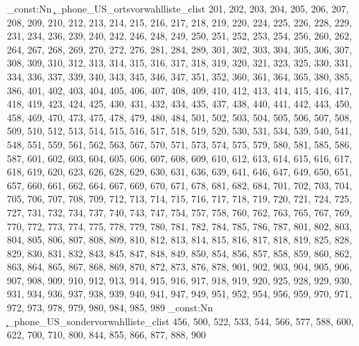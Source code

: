\clist_const:Nn \c_phone_US_ortsvorwahlliste_clist {201,
202,
203,
204,
205,
206,
207,
208,
209,
210,
212,
213,
214,
215,
216,
217,
218,
219,
220,
224,
225,
226,
228,
229,
231,
234,
236,
239,
240,
242,
246,
248,
249,
250,
251,
252,
253,
254,
256,
260,
262,
264,
267,
268,
269,
270,
272,
276,
281,
284,
289,
301,
302,
303,
304,
305,
306,
307,
308,
309,
310,
312,
313,
314,
315,
316,
317,
318,
319,
320,
321,
323,
325,
330,
331,
334,
336,
337,
339,
340,
343,
345,
346,
347,
351,
352,
360,
361,
364,
365,
380,
385,
386,
401,
402,
403,
404,
405,
406,
407,
408,
409,
410,
412,
413,
414,
415,
416,
417,
418,
419,
423,
424,
425,
430,
431,
432,
434,
435,
437,
438,
440,
441,
442,
443,
450,
458,
469,
470,
473,
475,
478,
479,
480,
484,
501,
502,
503,
504,
505,
506,
507,
508,
509,
510,
512,
513,
514,
515,
516,
517,
518,
519,
520,
530,
531,
534,
539,
540,
541,
548,
551,
559,
561,
562,
563,
567,
570,
571,
573,
574,
575,
579,
580,
581,
585,
586,
587,
601,
602,
603,
604,
605,
606,
607,
608,
609,
610,
612,
613,
614,
615,
616,
617,
618,
619,
620,
623,
626,
628,
629,
630,
631,
636,
639,
641,
646,
647,
649,
650,
651,
657,
660,
661,
662,
664,
667,
669,
670,
671,
678,
681,
682,
684,
701,
702,
703,
704,
705,
706,
707,
708,
709,
712,
713,
714,
715,
716,
717,
718,
719,
720,
721,
724,
725,
727,
731,
732,
734,
737,
740,
743,
747,
754,
757,
758,
760,
762,
763,
765,
767,
769,
770,
772,
773,
774,
775,
778,
779,
780,
781,
782,
784,
785,
786,
787,
801,
802,
803,
804,
805,
806,
807,
808,
809,
810,
812,
813,
814,
815,
816,
817,
818,
819,
825,
828,
829,
830,
831,
832,
843,
845,
847,
848,
849,
850,
854,
856,
857,
858,
859,
860,
862,
863,
864,
865,
867,
868,
869,
870,
872,
873,
876,
878,
901,
902,
903,
904,
905,
906,
907,
908,
909,
910,
912,
913,
914,
915,
916,
917,
918,
919,
920,
925,
928,
929,
930,
931,
934,
936,
937,
938,
939,
940,
941,
947,
949,
951,
952,
954,
956,
959,
970,
971,
972,
973,
978,
979,
980,
984,
985,
989}
\clist_const:Nn \c_phone_US_sondervorwahlliste_clist {456,
500,
522,
533,
544,
566,
577,
588,
600,
622,
700,
710,
800,
844,
855,
866,
877,
888,
900}
